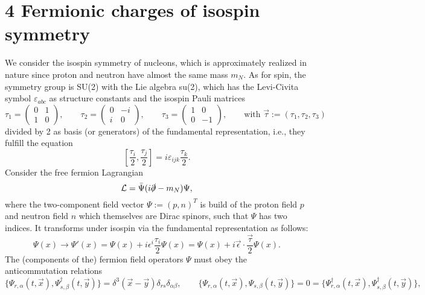 \documentclass[prd,%
,superscriptaddress,%
nofootinbib,%
tightenlines ]{revtex4}
\begin{document}
   
   
   
   
\section*{4 Fermionic charges of isospin symmetry}
\noindent
We consider the isospin symmetry of nucleons, which is approximately realized in nature since proton and neutron have almost the same mass $m_N$.
As for spin, the symmetry group is SU(2) with the Lie algebra su(2), which has the Levi-Civita symbol $\varepsilon_{abc}$ as structure constants and the isospin Pauli matrices
\begin{equation}
	\tau_1 = \begin{pmatrix} 0&1\\ 1&0 \end{pmatrix}, \qquad
	\tau_2 = \begin{pmatrix} 0&-i\\ i&0 \end{pmatrix}, \qquad
	\tau_3 = \begin{pmatrix} 1&0\\ 0&-1 \end{pmatrix}, \qquad
	\text{with } \vec{\tau} := (\tau_1, \tau_2, \tau_3)
\end{equation}
divided by 2 as basis (or generators) of the fundamental representation, i.e., they fulfill the equation
\begin{equation}
\left[ \frac{\tau_i}{2}, \frac{\tau_j}{2} \right] = i \varepsilon_{ijk} \frac{\tau_k}{2} .
\end{equation}
Consider the free fermion Lagrangian
\begin{equation}
\mathcal{L} = \bar\Psi ( i \slashed{\partial} - m_N ) \Psi ,
\end{equation}
where the two-component field vector $\Psi := (p,n)^T$ is build of the proton field $p$ and neutron field $n$ which themselves are Dirac spinors, such that $\Psi$ has two indices. It transforms under isospin via the fundamental representation as follows:
\begin{equation}
\label{eq:transformation_isospin}
\Psi(x) \rightarrow \Psi'(x) = \Psi(x) + i \epsilon^i \frac{\tau_i}{2} \Psi(x) = \Psi(x) + i \vec\epsilon \cdot \frac{\vec\tau}{2} \Psi(x) .
\end{equation}
The (components of the) fermion field operators $\Psi$ must obey the anticommutation relations
\begin{equation}
\label{eq:equ-time_commutation_fermions}
\{\Psi_{r,\alpha}(t,\vec x), \Psi_{s,\beta}^\dagger(t,\vec y)\} = \delta^3(\vec x - \vec y) \delta_{rs} \delta_{\alpha\beta} , \qquad
\{\Psi_{r,\alpha}(t,\vec x), \Psi_{s,\beta}(t,\vec y)\} = 0 = \{\Psi_{r,\alpha}^\dagger(t,\vec x), \Psi_{s,\beta}^\dagger(t,\vec y)\} ,
\end{equation}
\end{document}
